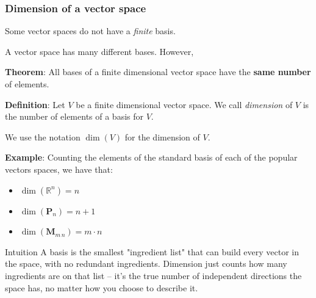 \begin{frame}[fragile]
\frametitle{Dimension of  a vector space}

Some vector spaces do not have a {\em finite} basis. 

A vector space has many different bases. However,



\textbf{Theorem}: All bases of a finite dimensional vector space have the \textbf{same number} of elements.

\bigskip

\textbf{Definition}: Let $V$ be a finite dimensional vector space. We call {\em dimension} of $V$ is the number of elements of a basis for $V$. 

We use the notation $\dim (V)$ for the dimension of $V$.

\bigskip

\textbf{Example}: Counting the elements of the standard basis of each of the popular vectors spaces, we have that:

\begin{itemize}

\item $\dim (\mathbb{R}^n) = n$

\item $\dim (\textbf{P}_n) = n+1$
 
\item $\dim (\textbf{M}_{m \, n}) = m \cdot n$

\end{itemize}

\begin{block}{Intuition}
A basis is the smallest "ingredient list" that can build every vector in the space, with no redundant ingredients. Dimension just counts how many ingredients are on that list -- it's the true number of independent directions the space has, no matter how you choose to describe it.
\end{block}

\end{frame}


